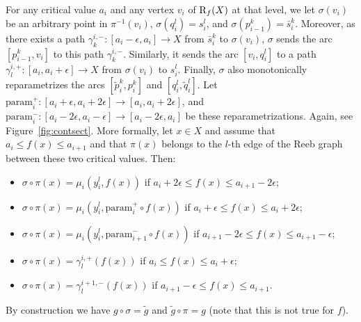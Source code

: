 For any critical value $a_i$ and any vertex $v_i$ of $\mathrm{R}_f(X)$ at that
level, we let $\sigma(v_i)$ be an arbitrary point in $\pi^{-1}(v_i)$,
$\sigma(q_i^l)=s_i^l$, and $\sigma(p_{i-1}^k)=\bar{s}_{i}^k$.
Moreover, as there exists a path
$\gamma_k^{i,-}:[a_i-\epsilon,a_i]\rightarrow X$ from $\bar{s}_{i}^k$ to
$\sigma(v_i)$, $\sigma$ sends the arc $[p_{i-1}^k,v_i]$ to this path
$\gamma_{k}^{i,-}$.  Similarly, it sends the arc $[v_i,q_i^l]$ to a path
$\gamma_l^{i,+}:[a_i,a_i+\epsilon]\rightarrow X$ from $\sigma(v_i)$ to
$s_i^l$.  Finally, $\sigma$ also monotonically reparametrizes the
arcs $[\tilde{p}_i^k,p_i^k]$ and $[q_i^l,\tilde{q}_i^l]$.  Let
$\text{param}_i^+:[a_i+\epsilon,a_i+2\epsilon]\rightarrow[a_i,a_i+2\epsilon]$,
and
$\text{param}_i^-:[a_i-2\epsilon,a_i-\epsilon]\rightarrow[a_i-2\epsilon,a_i]$
be these reparametrizations. Again, see Figure~\ref{fig:contsect}. 
More formally, let $x\in X$ and assume that $a_i\leq f(x)\leq a_{i+1}$
and that $\pi(x)$ belongs to the $l$-th edge of the Reeb graph between
these two critical values. Then:

\begin{itemize}
\item $\sigma\circ\pi(x)=\mu_i(y_i^l,f(x))$ if $a_i+2\epsilon\leq f(x)\leq a_{i+1}-2\epsilon$;

\item $\sigma\circ\pi(x)=\mu_i(y_i^l,\text{param}_i^+\circ f(x))$ if $a_i+\epsilon\leq f(x)\leq a_i+2\epsilon$;

\item $\sigma\circ\pi(x)=\mu_i(y_i^l,\text{param}_{i+1}^-\circ f(x))$ if $a_{i+1}-2\epsilon\leq f(x)\leq a_{i+1}-\epsilon$;

\item $\sigma\circ\pi(x)=\gamma_l^{i,+}(f(x))$ if $a_i\leq f(x)\leq a_i+\epsilon$;

\item $\sigma\circ\pi(x)=\gamma_l^{i+1,-}(f(x))$ if $a_{i+1}-\epsilon\leq f(x)\leq a_{i+1}$.
\end{itemize}


By construction we have $g\circ\sigma=\tilde{g}$ and $\tilde{g}\circ\pi=g$ (note that this is not true for $f$). 


